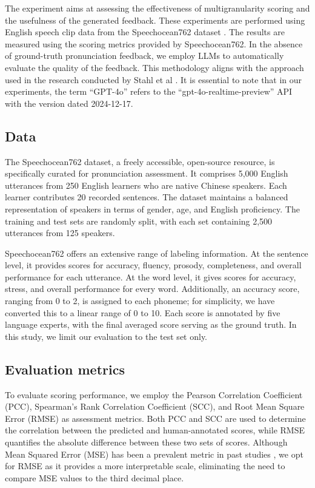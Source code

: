 \documentclass{Interspeech}
\begin{document}
The experiment aims at assessing the effectiveness of multigranularity scoring and the usefulness of the generated feedback. These experiments are performed using English speech clip data from the Speechocean762 dataset \cite{zhang2021speechocean762}. The results are measured using the scoring metrics provided by Speechocean762. In the absence of ground-truth pronunciation feedback, we employ LLMs to automatically evaluate the quality of the feedback. This methodology aligns with the approach used in the research conducted by Stahl et al \cite{stahl2024exploring}. It is essential to note that in our experiments, the term ``GPT-4o'' refers to the ``gpt-4o-realtime-preview'' API with the version dated 2024-12-17.

\subsection{Data}

The Speechocean762 dataset, a freely accessible, open-source resource, is specifically curated for pronunciation assessment. It comprises 5,000 English utterances from 250 English learners who are native Chinese speakers. Each learner contributes 20 recorded sentences. The dataset maintains a balanced representation of speakers in terms of gender, age, and English proficiency. The training and test sets are randomly split, with each set containing 2,500 utterances from 125 speakers.

Speechocean762 offers an extensive range of labeling information. At the sentence level, it provides scores for accuracy, fluency, prosody, completeness, and overall performance for each utterance. At the word level, it gives scores for accuracy, stress, and overall performance for every word. Additionally, an accuracy score, ranging from 0 to 2, is assigned to each phoneme; for simplicity, we have converted this to a linear range of 0 to 10. Each score is annotated by five language experts, with the final averaged score serving as the ground truth. In this study, we limit our evaluation to the test set only.

\subsection{Evaluation metrics}

To evaluate scoring performance, we employ the Pearson Correlation Coefficient (PCC), Spearman's Rank Correlation Coefficient (SCC), and Root Mean Square Error (RMSE) as assessment metrics. Both PCC and SCC are used to determine the correlation between the predicted and human-annotated scores, while RMSE quantifies the absolute difference between these two sets of scores. Although Mean Squared Error (MSE) has been a prevalent metric in past studies \cite{zhang2021speechocean762,gong2022transformer,chao2023hierarchical}, we opt for RMSE as it provides a more interpretable scale, eliminating the need to compare MSE values to the third decimal place.
\end{document}
